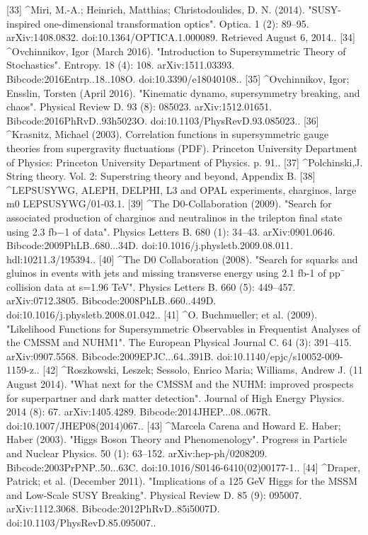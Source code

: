 [33]
^Miri, M.-A.; Heinrich, Matthias; Christodoulides, D. N. (2014). "SUSY-inspired one-dimensional transformation optics". Optica. 1 (2): 89–95. arXiv:1408.0832. doi:10.1364/OPTICA.1.000089. Retrieved August 6, 2014..
[34]
^Ovchinnikov, Igor (March 2016). "Introduction to Supersymmetric Theory of Stochastics". Entropy. 18 (4): 108. arXiv:1511.03393. Bibcode:2016Entrp..18..108O. doi:10.3390/e18040108..
[35]
^Ovchinnikov, Igor; Ensslin, Torsten (April 2016). "Kinematic dynamo, supersymmetry breaking, and chaos". Physical Review D. 93 (8): 085023. arXiv:1512.01651. Bibcode:2016PhRvD..93h5023O. doi:10.1103/PhysRevD.93.085023..
[36]
^Krasnitz, Michael (2003). Correlation functions in supersymmetric gauge theories from supergravity fluctuations (PDF). Princeton University Department of Physics: Princeton University Department of Physics. p. 91..
[37]
^Polchinski,J. String theory. Vol. 2: Superstring theory and beyond, Appendix B.
[38]
^LEPSUSYWG, ALEPH, DELPHI, L3 and OPAL experiments, charginos, large m0 LEPSUSYWG/01-03.1.
[39]
^The D0-Collaboration (2009). "Search for associated production of charginos and neutralinos in the trilepton final state using 2.3 fb−1 of data". Physics Letters B. 680 (1): 34–43. arXiv:0901.0646. Bibcode:2009PhLB..680...34D. doi:10.1016/j.physletb.2009.08.011. hdl:10211.3/195394..
[40]
^The D0 Collaboration (2008). "Search for squarks and gluinos in events with jets and missing transverse energy using 2.1 fb-1 of pp¯ collision data at s=1.96 TeV". Physics Letters B. 660 (5): 449–457. arXiv:0712.3805. Bibcode:2008PhLB..660..449D. doi:10.1016/j.physletb.2008.01.042..
[41]
^O. Buchmueller; et al. (2009). "Likelihood Functions for Supersymmetric Observables in Frequentist Analyses of the CMSSM and NUHM1". The European Physical Journal C. 64 (3): 391–415. arXiv:0907.5568. Bibcode:2009EPJC...64..391B. doi:10.1140/epjc/s10052-009-1159-z..
[42]
^Roszkowski, Leszek; Sessolo, Enrico Maria; Williams, Andrew J. (11 August 2014). "What next for the CMSSM and the NUHM: improved prospects for superpartner and dark matter detection". Journal of High Energy Physics. 2014 (8): 67. arXiv:1405.4289. Bibcode:2014JHEP...08..067R. doi:10.1007/JHEP08(2014)067..
[43]
^Marcela Carena and Howard E. Haber; Haber (2003). "Higgs Boson Theory and Phenomenology". Progress in Particle and Nuclear Physics. 50 (1): 63–152. arXiv:hep-ph/0208209. Bibcode:2003PrPNP..50...63C. doi:10.1016/S0146-6410(02)00177-1..
[44]
^Draper, Patrick; et al. (December 2011). "Implications of a 125 GeV Higgs for the MSSM and Low-Scale SUSY Breaking". Physical Review D. 85 (9): 095007. arXiv:1112.3068. Bibcode:2012PhRvD..85i5007D. doi:10.1103/PhysRevD.85.095007..